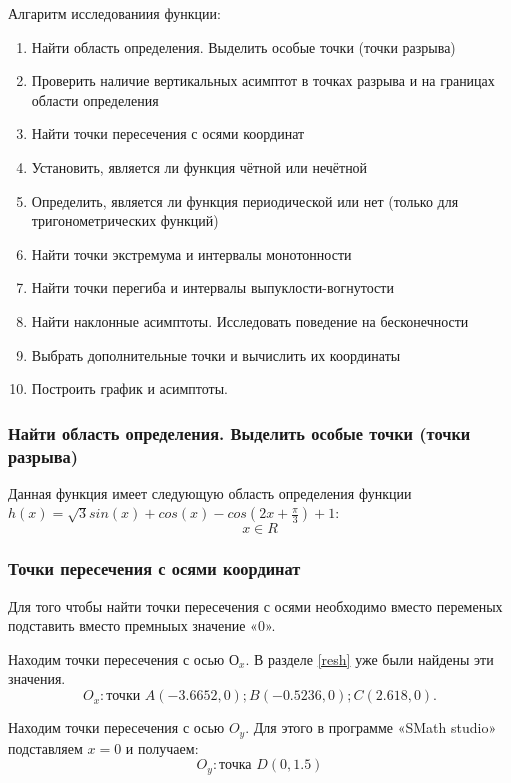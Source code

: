 \documentclass[russian,utf8,nocolumnxxxi,nocolumnxxxii]{eskdtext}
\begin{document}
Алгаритм исследованиия функции:
\begin{enumerate}
 \item Найти область определения. Выделить особые точки (точки разрыва)
 \item Проверить наличие вертикальных асимптот в точках разрыва и на границах области определения
 \item Найти точки пересечения с осями координат
\item Установить, является ли функция чётной или нечётной
\item Определить, является ли функция периодической или нет (только для тригонометрических функций)
\item Найти точки экстремума и интервалы монотонности
\item Найти точки перегиба и интервалы выпуклости-вогнутости
\item Найти наклонные асимптоты. Исследовать поведение на бесконечности
\item Выбрать дополнительные точки и вычислить их координаты
\item Построить график и асимптоты.
\end{enumerate}

\subsubsection{Найти область определения. Выделить особые точки (точки разрыва)}

Данная функция имеет следующую область определения функции $ h(x)=\sqrt{3} sin(x)+cos(x)-cos(2x+\frac{\pi}{3})+1$: 
$$x\in R$$


\subsubsection{Точки пересечения с осями координат}

Для того чтобы найти точки пересечения с осями необходимо вместо переменых подставить вместо премныых значение «0».

Находим точки пересечения с осью $О_x$. В разделе \ref{resh}  уже были найдены эти значения. 
$$
O_x: \text{точки } A(-3.6652, 0);  B( -0.5236, 0); C(2.618, 0).
$$

Находим точки пересечения с осью $O_y$. Для этого в программе «SMath studio» подставляем $x=0$ и получаем:
$$
O_y: \text{точка } D (0, 1.5)
$$
\end{document}
